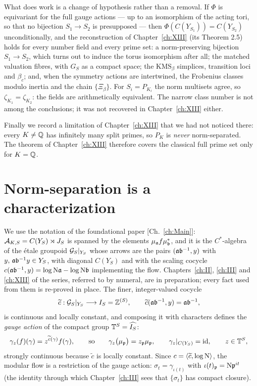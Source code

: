 \begin{summary}
What does work is a change of hypothesis rather than a removal. If $\Phi$ is equivariant for
the full gauge actions --- up to an isomorphism of the acting tori, so that no bijection
$S_1\to S_2$ is presupposed --- then $\Phi(C(Y_{S_1}))=C(Y_{S_2})$ unconditionally, and the
reconstruction of Chapter~\ref{ch:XIII} (its Theorem 2.5) holds for every number field and every prime
set: a norm-preserving bijection $S_1\to S_2$, which turns out to induce the torus
isomorphism after all; the matched valuation fibres, with $G_S$ as a compact space; the
$\mathrm{KMS}_\beta$ simplices, transition loci and $\beta_c$; and, when the symmetry actions
are intertwined, the Frobenius classes modulo inertia and the chain $\{\Xi_\beta\}$. For
$S_i=P_{K_i}$ the norm multisets agree, so $\zeta_{K_1}=\zeta_{K_2}$: the fields are
arithmetically equivalent. The narrow class number is not among the conclusions; it was not
recovered in Chapter~\ref{ch:XIII} either.

Finally we record a limitation of Chapter~\ref{ch:XIII} that we had not noticed there: every $K\ne\mathbb{Q}$
has infinitely many split primes, so $P_K$ is \emph{never} norm-separated. The theorem of
Chapter~\ref{ch:XIII} therefore covers the classical full prime set only for $K=\mathbb{Q}$.
\end{summary}


\section{Norm-separation is a characterization}

We use the notation of the foundational paper [Ch.~\ref{ch:Main}]: $\mathcal{A}_{K,S}=C(Y_S)\rtimes J_S$ is
spanned by the elements $\mu_{\mathfrak{a}} f\mu_{\mathfrak{b}}^*$, and it is the $C^*$-algebra of the \'etale
groupoid $\mathcal{G}_S|_{Y_S}$ whose arrows are the pairs $(\mathfrak{a}\mathfrak{b}^{-1},y)$ with
$y,\,\mathfrak{a}\mathfrak{b}^{-1}y\in Y_S$, with diagonal $C(Y_S)$ and with the scaling cocycle
$c(\mathfrak{a}\mathfrak{b}^{-1},y)=\log\mathrm{N}\mathfrak{a}-\log\mathrm{N}\mathfrak{b}$ implementing the flow. Chapters~\ref{ch:II}, \ref{ch:III} and \ref{ch:XIII} of
the series, referred to by numeral, are in preparation; every fact used from them is
re-proved in place. The finer, integer-valued cocycle
\[
\widetilde c:\mathcal{G}_S|_{Y_S}\longrightarrow I_S=\mathbb{Z}^{(S)},\qquad
\widetilde c(\mathfrak{a}\mathfrak{b}^{-1},y)=\mathfrak{a}\mathfrak{b}^{-1},
\]
is continuous and locally constant, and composing it with characters defines the
\emph{gauge action} of the compact group $\mathbb{T}^S=\widehat{I_S}$:
\[
\gamma_z(f)(\gamma)=z^{\widetilde c(\gamma)}f(\gamma),\qquad\text{so}\qquad
\gamma_z\bigl(\mu_{\mathfrak{p}}\bigr)=z_{\mathfrak{p}}\mu_{\mathfrak{p}},\qquad \gamma_z|_{C(Y_S)}=\mathrm{id},\qquad z\in\mathbb{T}^S,
\]
strongly continuous because $\widetilde c$ is locally constant. Since
$c=\langle\widetilde c,\log\mathrm{N}\rangle$, the modular flow is a restriction of the gauge
action: $\sigma_t=\gamma_{\iota(t)}$ with $\iota(t)_{\mathfrak{p}}=\mathrm{N}\mathfrak{p}^{it}$ (the identity through
which Chapter~\ref{ch:III} sees that $\{\sigma_t\}$ has compact closure).


